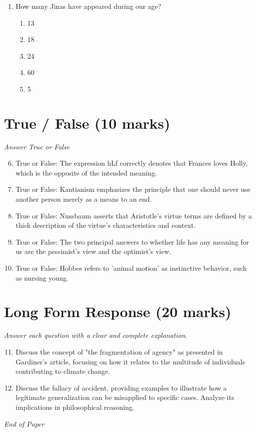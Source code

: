 \documentclass[12pt]{article}
\begin{document}
\begin{enumerate}[label=\arabic*.]
\begin{enumerate}[label=(\alph*)]
    \item why people who preserve the environment might be good people.
    \item how destroying the environment affects future generations.
    \item why the act of destroying nature might be immoral.
\end{enumerate}
\item How many Jinas have appeared during our age?
\begin{enumerate}[label=(\alph*)]
    \item 13
    \item 18
    \item 24
    \item 60
    \item 5
\end{enumerate}
\end{enumerate}

\section*{True / False (10 marks)}
\textit{Answer True or False}
\begin{enumerate}[label=\arabic*.]
\setcounter{enumi}{5}
\item True or False: The expression hLf correctly denotes that Frances loves Holly, which is the opposite of the intended meaning.
\item True or False: Kantianism emphasizes the principle that one should never use another person merely as a means to an end.
\item True or False: Nussbaum asserts that Aristotle's virtue terms are defined by a thick description of the virtue's characteristics and context.
\item True or False: The two principal answers to whether life has any meaning for us are the pessimist's view and the optimist's view.
\item True or False: Hobbes refers to 'animal motion' as instinctive behavior, such as nursing young.
\end{enumerate}

\section*{Long Form Response (20 marks)}
\textit{Answer each question with a clear and complete explanation.}
\begin{enumerate}[label=\arabic*.]
\setcounter{enumi}{10}
\item Discuss the concept of "the fragmentation of agency" as presented in Gardiner's article, focusing on how it relates to the multitude of individuals contributing to climate change.
\item Discuss the fallacy of accident, providing examples to illustrate how a legitimate generalization can be misapplied to specific cases. Analyze its implications in philosophical reasoning.
\end{enumerate}

\vfill
\noindent\textit{End of Paper}
\end{document}

